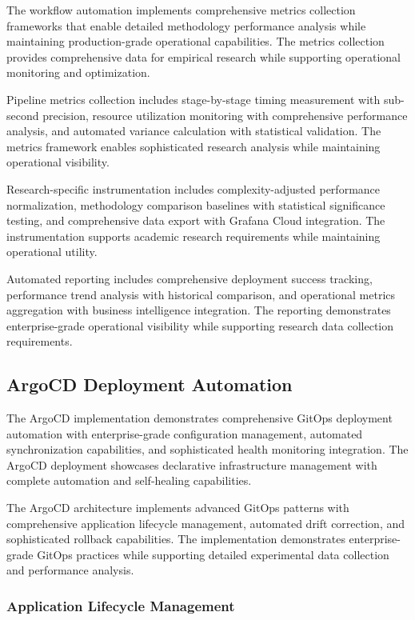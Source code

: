 The workflow automation implements comprehensive metrics collection frameworks that enable detailed methodology performance analysis while maintaining production-grade operational capabilities. The metrics collection provides comprehensive data for empirical research while supporting operational monitoring and optimization.

Pipeline metrics collection includes stage-by-stage timing measurement with sub-second precision, resource utilization monitoring with comprehensive performance analysis, and automated variance calculation with statistical validation. The metrics framework enables sophisticated research analysis while maintaining operational visibility.

Research-specific instrumentation includes complexity-adjusted performance normalization, methodology comparison baselines with statistical significance testing, and comprehensive data export with Grafana Cloud integration. The instrumentation supports academic research requirements while maintaining operational utility.

Automated reporting includes comprehensive deployment success tracking, performance trend analysis with historical comparison, and operational metrics aggregation with business intelligence integration. The reporting demonstrates enterprise-grade operational visibility while supporting research data collection requirements.

\subsection{ArgoCD Deployment Automation}

The ArgoCD implementation demonstrates comprehensive GitOps deployment automation with enterprise-grade configuration management, automated synchronization capabilities, and sophisticated health monitoring integration. The ArgoCD deployment showcases declarative infrastructure management with complete automation and self-healing capabilities.

The ArgoCD architecture implements advanced GitOps patterns with comprehensive application lifecycle management, automated drift correction, and sophisticated rollback capabilities. The implementation demonstrates enterprise-grade GitOps practices while supporting detailed experimental data collection and performance analysis.

\subsubsection{Application Lifecycle Management}

